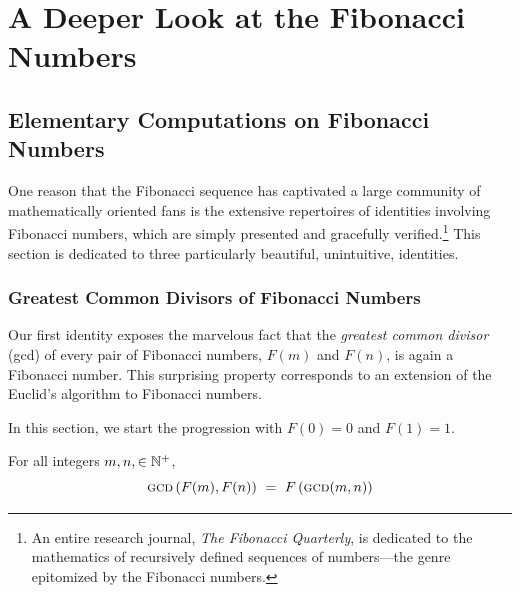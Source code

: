 
\chapter{A Deeper Look at the Fibonacci Numbers}
\label{ch:FIBO-enrich}

\noindent {}


\section{Elementary Computations on Fibonacci Numbers}
\label{sec:FIBO-enrich-ops}


One reason that the Fibonacci sequence has captivated a large community of mathematically oriented fans is the extensive repertoires of identities involving Fibonacci numbers, which are simply presented and gracefully verified.\footnote{An entire research journal, {\it The Fibonacci Quarterly}, is dedicated to the mathematics of recursively defined sequences of numbers---the genre epitomized by the Fibonacci numbers.}  This section is dedicated to three particularly beautiful,  unintuitive, identities.

\subsection{Greatest Common Divisors of Fibonacci Numbers}
\label{Appendix:FiboGCD}

Our first identity exposes the marvelous fact that the {\em greatest common divisor} ({\sc gcd}) of every pair of Fibonacci numbers, $F(m)$ and $F(n)$, is again a Fibonacci number.
This surprising property corresponds to an extension of the Euclid's algorithm to Fibonacci numbers.

In this section, we start the progression with $F(0) = 0$ and $F(1) = 1$.

\begin{prop}
For all integers $m, n, \in \mathbb{N}^+$,
\begin{equation}
\label{eq:fibo-gcd}
\mbox{\sc gcd} \left(F(m), F(n) \right) \ = \ F \left(\mbox{\sc gcd}(m, n) \right)
\end{equation}
\end{prop}

